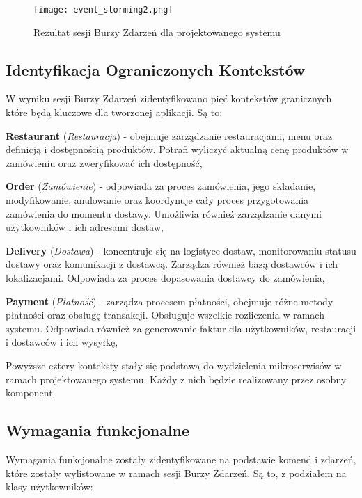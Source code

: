 \clearpage

\begin{figure}[!h]
    \centering \texttt{[image: event\_storming2.png]}
    \caption{Rezultat sesji Burzy Zdarzeń dla projektowanego systemu}
\end{figure}

\subsection{Identyfikacja Ograniczonych Kontekstów}

W wyniku sesji Burzy Zdarzeń zidentyfikowano pięć kontekstów granicznych, które będą kluczowe dla tworzonej aplikacji. Są to:

\textbf{Restaurant} (\textit{Restauracja}) - obejmuje zarządzanie restauracjami, menu oraz definicją i dostępnością produktów. Potrafi wyliczyć aktualną cenę produktów w zamówieniu oraz zweryfikować ich dostępność,

\textbf{Order} (\textit{Zamówienie}) - odpowiada za proces zamówienia, jego składanie, modyfikowanie, anulowanie oraz koordynuje cały proces przygotowania zamówienia do momentu dostawy. Umożliwia również zarządzanie danymi użytkowników i ich adresami dostaw,

\textbf{Delivery} (\textit{Dostawa}) - koncentruje się na logistyce dostaw, monitorowaniu statusu dostawy oraz komunikacji z dostawcą. Zarządza również bazą dostawców i ich lokalizacjami. Odpowiada za proces dopasowania dostawcy do zamówienia,

\textbf{Payment} (\textit{Płatność}) - zarządza procesem płatności, obejmuje różne metody płatności oraz obsługę transakcji. Obsługuje wszelkie rozliczenia w ramach systemu. Odpowiada również za generowanie faktur dla użytkowników, restauracji i dostawców i ich wysyłkę,

\medskip

Powyższe cztery konteksty stały się podstawą do wydzielenia mikroserwisów w ramach projektowanego systemu. Każdy z nich będzie realizowany przez osobny komponent.

\subsection{Wymagania funkcjonalne}

Wymagania funkcjonalne zostały zidentyfikowane na podstawie komend i zdarzeń, które zostały wylistowane w ramach sesji Burzy Zdarzeń. Są to, z podziałem na klasy użytkowników:

